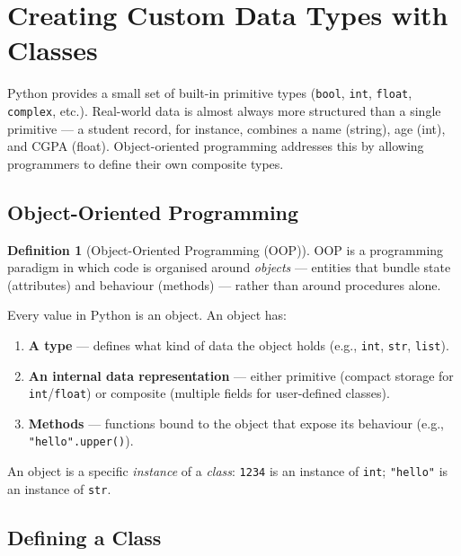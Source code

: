 \documentclass[11pt, a4paper, notitlepage]{report}
\theoremstyle{definition}
\newtheorem{definition}[theorem]{Definition}
\theoremstyle{remark}
\theoremstyle{definition}
\begin{document}
\section{Creating Custom Data Types with Classes}
\label{sec:custom-data-types}

Python provides a small set of built-in primitive types (\texttt{bool},
\texttt{int}, \texttt{float}, \texttt{complex}, etc.). Real-world data is almost
always more structured than a single primitive --- a student record, for instance,
combines a name (string), age (int), and CGPA (float). Object-oriented programming
addresses this by allowing programmers to define their own composite types.

\subsection{Object-Oriented Programming}
\label{subsec:oop}

\begin{definition}[Object-Oriented Programming (OOP)]
OOP is a programming paradigm in which code is organised around \emph{objects}
--- entities that bundle state (attributes) and behaviour (methods) --- rather
than around procedures alone.
\end{definition}

Every value in Python is an object. An object has:
\begin{enumerate}
  \item \textbf{A type} --- defines what kind of data the object holds
        (e.g., \texttt{int}, \texttt{str}, \texttt{list}).
  \item \textbf{An internal data representation} --- either primitive (compact
        storage for \texttt{int}/\texttt{float}) or composite (multiple fields
        for user-defined classes).
  \item \textbf{Methods} --- functions bound to the object that expose its
        behaviour (e.g., \texttt{"hello".upper()}).
\end{enumerate}

An object is a specific \emph{instance} of a \emph{class}: \texttt{1234} is an
instance of \texttt{int}; \texttt{"hello"} is an instance of \texttt{str}.

\subsection{Defining a Class}
\label{subsec:defining-class}
\end{document}
